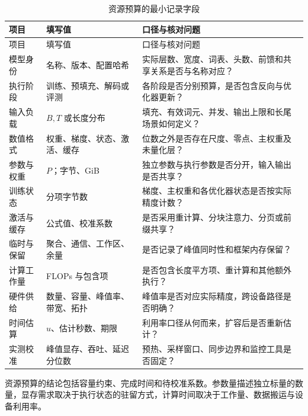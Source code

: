 \documentclass[../textbook.tex]{subfiles}
\begin{document}
\begin{longtable}{@{}p{.25\linewidth}p{.27\linewidth}p{.39\linewidth}@{}}
\caption{资源预算的最小记录字段}\label{tab:appendix-resource-worksheet}\\
\toprule
项目 & 填写值 & 口径与核对问题\\\midrule
\endfirsthead
\toprule
项目 & 填写值 & 口径与核对问题\\\midrule
\endhead
模型身份 & 名称、版本、配置哈希 & 实际层数、宽度、词表、头数、前馈和共享关系是否与名称对应？\\
执行阶段 & 训练、预填充、解码或评测 & 各阶段是否分别预算，是否包含反向与优化器更新？\\
输入负载 & $B,T$ 或长度分布 & 填充、有效词元、并发、输出上限和长尾场景如何定义？\\
数值格式 & 权重、梯度、状态、激活、缓存 & 位数之外是否存在尺度、零点、主权重及未量化层？\\
参数与权重 & $P$；字节、GiB & 独立参数与执行参数是否分开，输入输出是否共享？\\
训练状态 & 分项字节数 & 梯度、主权重和各优化器状态是否按实际精度计数？\\
激活与缓存 & 公式值、校准系数 & 是否采用重计算、分块注意力、分页或前缀共享？\\
临时与保留 & 聚合、通信、工作区、余量 & 是否记录了峰值同时性和框架内存保留？\\
计算工作量 & FLOPs 与包含项 & 是否包含长度平方项、重计算和其他额外执行？\\
硬件供给 & 数量、容量、峰值率、带宽、拓扑 & 峰值率是否对应实际精度，跨设备路径是否明确？\\
时间估算 & $u$、估计秒数、期限 & 利用率口径从何而来，扩容后是否重新估计？\\
实测校准 & 峰值显存、吞吐、延迟分位数 & 预热、采样窗口、同步边界和监控工具是否固定？\\
\bottomrule
\end{longtable}

资源预算的结论包括容量约束、完成时间和待校准系数。参数量描述独立标量的数量，显存需求取决于执行状态的驻留方式，计算时间取决于工作量、数据搬运与设备利用率。

\chapterreferences
\myendchapterdocument
\end{document}
